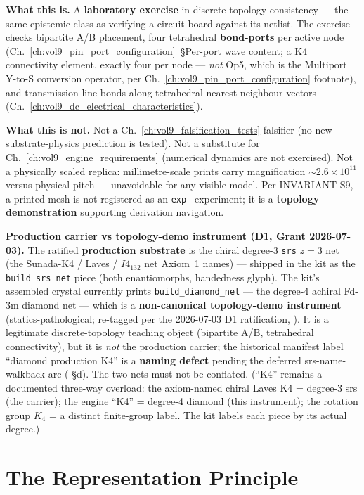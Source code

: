 \textbf{What this is.} A \textbf{laboratory exercise} in discrete-topology consistency --- the same epistemic class as verifying a circuit board against its netlist. The exercise checks bipartite A/B placement, four tetrahedral \textbf{bond-ports} per active node (Ch.~\ref{ch:vol9_pin_port_configuration}~\S Per-port wave content; a K4 connectivity element, exactly four per node --- \emph{not} Op5, which is the Multiport Y-to-S conversion operator, per Ch.~\ref{ch:vol9_pin_port_configuration} footnote), and transmission-line bonds along tetrahedral nearest-neighbour vectors (Ch.~\ref{ch:vol9_dc_electrical_characteristics}).

\textbf{What this is not.} Not a Ch.~\ref{ch:vol9_falsification_tests} falsifier (no new substrate-physics prediction is tested). Not a substitute for Ch.~\ref{ch:vol9_engine_requirements} (numerical dynamics are not exercised). Not a physically scaled replica: millimetre-scale prints carry magnification $\sim\!2.6\times10^{11}$ versus physical pitch --- unavoidable for any visible model. Per INVARIANT-S9, a printed mesh is not registered as an \texttt{exp-} experiment; it is a \textbf{topology demonstration} supporting derivation navigation.

\textbf{Production carrier vs topology-demo instrument (D1, Grant 2026-07-03).} The ratified \textbf{production substrate} is the chiral degree-3 \texttt{srs} $z=3$ net (the Sunada-K4 / Laves / $I4_132$ net Axiom~1 names) --- shipped in the kit as the \texttt{build\_srs\_net} piece (both enantiomorphs, handedness glyph). The kit's assembled crystal currently prints \texttt{build\_diamond\_net} --- the degree-4 achiral Fd-3m diamond net --- which is a \textbf{non-canonical topology-demo instrument} (statics-pathological; re-tagged per the 2026-07-03 D1 ratification, ). It is a legitimate discrete-topology teaching object (bipartite A/B, tetrahedral connectivity), but it is \emph{not} the production carrier; the historical manifest label ``diamond production K4'' is a \textbf{naming defect} pending the deferred srs-name-walkback arc ( §d). The two nets must not be conflated. (``K4'' remains a documented three-way overload: the axiom-named chiral Laves K4 = degree-3 srs (the carrier); the engine ``K4'' = degree-4 diamond (this instrument); the rotation group $K_4$ = a distinct finite-group label. The kit labels each piece by its actual degree.)

\section{The Representation Principle}
\label{sec:vol9_exp_prints_representation}

